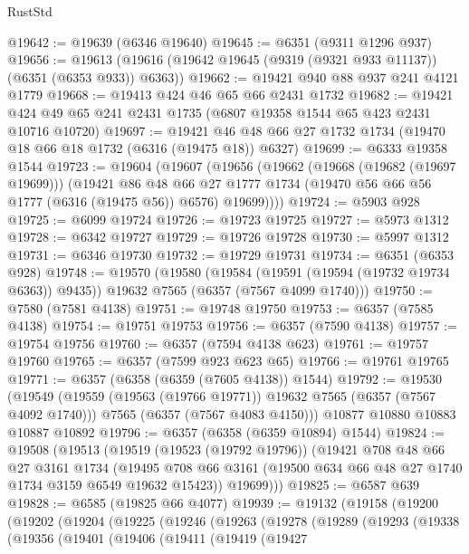 \begin{lexlean}{RustStd}
\begin{coremodule}
@19642 := @19639 (@6346 @19640)
@19645 := @6351 (@9311 @1296 @937)
@19656 := @19613 (@19616 (@19642 @19645 (@9319 (@9321 @933 @11137)) (@6351 (@6353 @933)) @6363))
@19662 := @19421 @940 @88 @937 @241 @4121 @1779
@19668 := @19413 @424 @46 @65 @66 @2431 @1732
@19682 := @19421 @424 @49 @65 @241 @2431 @1735 (@6807 @19358 @1544 @65 @423 @2431 @10716 @10720)
@19697 := @19421 @46 @48 @66 @27 @1732 @1734 (@19470 @18 @66 @18 @1732 (@6316 (@19475 @18)) @6327)
@19699 := @6333 @19358 @1544
@19723 := @19604
    (@19607
      (@19656
        (@19662
          (@19668 (@19682 (@19697 @19699)))
          (@19421
            @86
            @48
            @66
            @27
            @1777
            @1734
            (@19470 @56 @66 @56 @1777 (@6316 (@19475 @56)) @6576)
            @19699))))
@19724 := @5903 @928
@19725 := @6099 @19724
@19726 := @19723 @19725
@19727 := @5973 @1312
@19728 := @6342 @19727
@19729 := @19726 @19728
@19730 := @5997 @1312
@19731 := @6346 @19730
@19732 := @19729 @19731
@19734 := @6351 (@6353 @928)
@19748 := @19570
    (@19580
      (@19584 (@19591 (@19594 (@19732 @19734 @6363)) @9435))
      @19632
      @7565
      (@6357 (@7567 @4099 @1740)))
@19750 := @7580 (@7581 @4138)
@19751 := @19748 @19750
@19753 := @6357 (@7585 @4138)
@19754 := @19751 @19753
@19756 := @6357 (@7590 @4138)
@19757 := @19754 @19756
@19760 := @6357 (@7594 @4138 @623)
@19761 := @19757 @19760
@19765 := @6357 (@7599 @923 @623 @65)
@19766 := @19761 @19765
@19771 := @6357 (@6358 (@6359 (@7605 @4138)) @1544)
@19792 := @19530
    (@19549
      (@19559 (@19563 (@19766 @19771)) @19632 @7565 (@6357 (@7567 @4092 @1740)))
      @7565
      (@6357 (@7567 @4083 @4150)))
    @10877
    @10880
    @10883
    @10887
    @10892
@19796 := @6357 (@6358 (@6359 @10894) @1544)
@19824 := @19508
    (@19513
      (@19519
        (@19523 (@19792 @19796))
        (@19421
          @708
          @48
          @66
          @27
          @3161
          @1734
          (@19495 @708 @66 @3161 (@19500 @634 @66 @48 @27 @1740 @1734 @3159 @6549 @19632 @15423))
          @19699)))
@19825 := @6587 @639
@19828 := @6585 (@19825 @66 @4077)
@19939 := @19132
    (@19158
      (@19200
        (@19202
          (@19204
            (@19225
              (@19246
                (@19263
                  (@19278
                    (@19289
                      (@19293
                        (@19338
                          (@19356
                            (@19401
                              (@19406
                                (@19411
                                  (@19419
                                    (@19427

\end{coremodule}
\end{lexlean}
